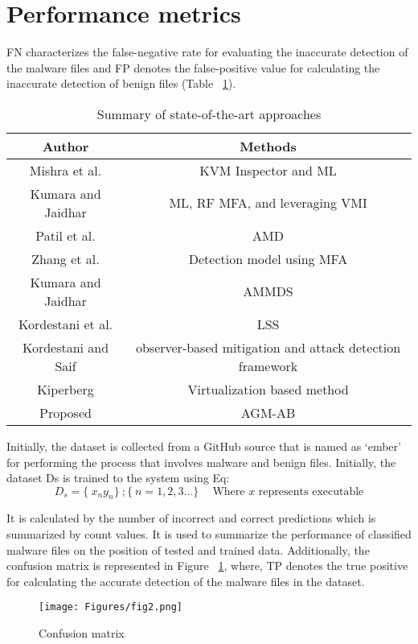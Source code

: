 \documentclass{gji}
\begin{document}
\section {Performance metrics}
FN characterizes the false-negative rate for evaluating the inaccurate detection of the malware files and FP denotes the false-positive value for calculating the inaccurate detection of benign files (Table ~\ref{tab:freq1}).
\begin{table}
  \caption{Summary of state-of-the-art approaches}
  \label{tab:freq1}
  \begin{tabular}{cc}
    Author&Methods\\
    \midrule
        Mishra et al.&KVM Inspector and ML\\
    \midrule
        Kumara and Jaidhar&ML, RF MFA, and leveraging VMI\\
    \midrule
        Patil et al.&AMD\\
    \midrule
        Zhang et al.&Detection model using MFA\\
    \midrule
        Kumara and Jaidhar&AMMDS\\
    \midrule
        Kordestani et al.&LSS\\
    \midrule
        Kordestani and Saif&observer-based mitigation and attack detection framework\\
    \midrule
        Kiperberg&Virtualization based method\\
    \midrule
        Proposed&AGM-AB\\
\end{tabular}
\end{table}
\par Initially, the dataset is collected from a GitHub source that is named as ‘ember’ for performing the process that involves malware and benign files. Initially, the dataset Ds is trained to the system using Eq:
$$
D_s =  \{\ x_n y_n\}\ ; \{\ n = 1,2,3...\}\ \quad \text{Where $x$ represents executable} 
$$
\par It is calculated by the number of incorrect and correct predictions which is summarized by count values. It is used to summarize the performance of classified malware files on the position of tested and trained data. Additionally, the confusion matrix is represented in Figure ~\ref{Figure 2:image}, where, TP denotes the true positive for calculating the accurate detection of the malware files in the dataset. 
\begin{figure}
  \centering
  \texttt{[image: Figures/fig2.png]}
  \caption{Confusion matrix}
  \label{Figure 2:image}
\end{figure}
\end{document}
